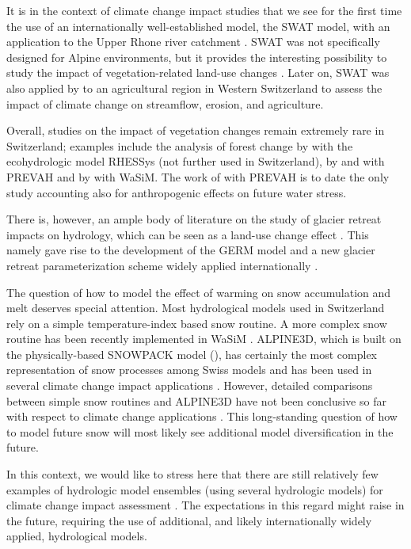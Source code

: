 \documentclass[10pt,a4paper]{article}
\begin{document}
It is in the context of climate change impact studies that we see for the first time the use of an internationally well-established model, the SWAT model, with an application to the Upper Rhone river catchment \citep{Rahman2014}. SWAT was not specifically designed for Alpine environments, but it provides the interesting possibility to study the impact of vegetation-related land-use changes \citep{Rahman2015}. Later on, SWAT was also applied by \citet{Zarrineh2020} to an agricultural region in Western Switzerland to assess the impact of climate change on streamflow, erosion, and agriculture.

Overall, studies on the impact of vegetation changes remain extremely rare in Switzerland; examples include the analysis of forest change by \citet{zierl05} with the ecohydrologic model RHESSys (not further used in Switzerland), by \citet{Koplin2013} and \citet{Schattan2013} with PREVAH and by \citet{Alaoui2014} with WaSiM. The work of \citet{Milano2015a} with PREVAH is to date the only study accounting also for anthropogenic effects on future water stress. 

There is, however, an ample body of literature on the study of glacier retreat impacts on hydrology, which can be seen as a land-use change effect \citep{Horton2006,Schaefli2007b,Finger2015,Etter2017,Addor2014,Junghans2011}.  This namely gave rise to the development of the GERM model \citep{Huss2016,Junghans2011,Farinotti2012,Finger2013}  and a new glacier retreat parameterization scheme widely applied internationally \citep{Huss2010}.

The question of how to model the effect of warming on snow accumulation and melt deserves special attention. Most hydrological models used in Switzerland rely on a simple temperature-index based snow routine. A more complex snow routine has been recently implemented in  WaSiM \citep{Thornton2021}. ALPINE3D, which is built on the physically-based SNOWPACK model (\citealt{Lehning2002,Bartelt_2002,Bartelt2002,Lehning_2002}),  has certainly the most complex representation of snow processes among Swiss  models and has been used in several climate change impact applications \citep{Bavay2009,Bavay2013,Marty2017}. However, detailed comparisons between simple snow routines and ALPINE3D have not been conclusive so far with respect to climate change applications \citep{Kobierska2011,Shakoor2018}. This long-standing question of how to model future snow will most likely see additional model diversification in the future. 

In this context, we would like to stress here that there are still relatively few examples of hydrologic model ensembles (using several hydrologic models) for climate change impact assessment \citep{Kobierska2011,Addor2014}. The expectations in this regard might raise in the future, requiring the use of additional, and likely internationally widely applied, hydrological models.
\end{document}
